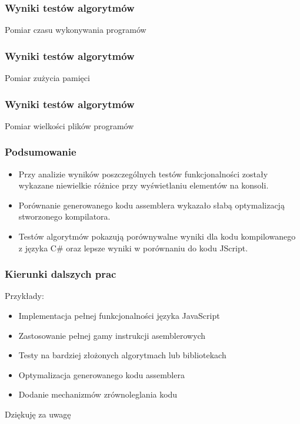 \begin{frame}
  \frametitle{Wyniki testów algorytmów}
  \begin{block}{Pomiar czasu wykonywania programów}
    
  \end{block}
\end{frame}

\begin{frame}
  \frametitle{Wyniki testów algorytmów}
  \begin{block}{Pomiar zużycia pamięci}
    
  \end{block}
\end{frame}

\begin{frame}
  \frametitle{Wyniki testów algorytmów}
  \begin{block}{Pomiar wielkości plików programów}
    
  \end{block}
\end{frame}

\begin{frame}
  \frametitle{Podsumowanie}
  \begin{itemize}
    \item  Przy analizie wyników poszczególnych testów funkcjonalności zostały wykazane niewielkie różnice przy wyświetlaniu elementów na
    konsoli.
    \item Porównanie generowanego kodu assemblera wykazało słabą optymalizacją stworzonego kompilatora.
    \item Testów algorytmów pokazują porównywalne wyniki dla kodu kompilowanego z języka C\# oraz lepsze wyniki w porównaniu do kodu JScript.
  \end{itemize}
\end{frame}

\begin{frame}
  \frametitle{Kierunki dalszych prac}
  \begin{block}{Przykłady:}
    \begin{itemize}
      \item  Implementacja pełnej funkcjonalności języka JavaScript
      \item  Zastosowanie pełnej gamy instrukcji asemblerowych
      \item  Testy na bardziej złożonych algorytmach lub bibliotekach
      \item  Optymalizacja generowanego kodu assemblera
      \item  Dodanie mechanizmów zrównoleglania kodu
    \end{itemize}
  \end{block}
\end{frame}

\begin{frame}
	\begin{center}
	\Huge Dziękuję za uwagę
	\end{center}
\end{frame}
